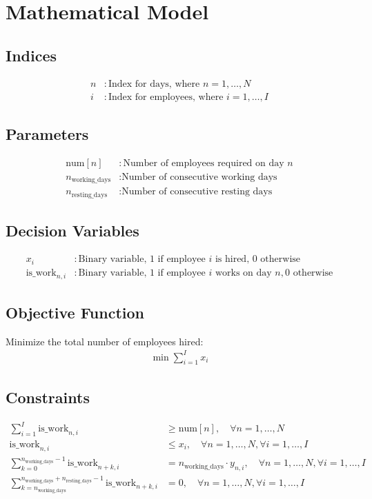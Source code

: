 \documentclass{article}
\begin{document}
\section*{Mathematical Model}

\subsection*{Indices}
\begin{align*}
n & : \text{Index for days, where } n = 1, \ldots, N \\
i & : \text{Index for employees, where } i = 1, \ldots, I 
\end{align*}

\subsection*{Parameters}
\begin{align*}
\text{num}[n] & : \text{Number of employees required on day } n \\
n_{\text{working\_days}} & : \text{Number of consecutive working days} \\
n_{\text{resting\_days}} & : \text{Number of consecutive resting days}
\end{align*}

\subsection*{Decision Variables}
\begin{align*}
x_i & : \text{Binary variable, 1 if employee } i \text{ is hired, 0 otherwise} \\
\text{is\_work}_{n,i} & : \text{Binary variable, 1 if employee } i \text{ works on day } n, 0 \text{ otherwise}
\end{align*}

\subsection*{Objective Function}
Minimize the total number of employees hired:
\begin{align*}
\min \sum_{i=1}^{I} x_i
\end{align*}

\subsection*{Constraints}
\begin{align}
\sum_{i=1}^{I} \text{is\_work}_{n,i} & \geq \text{num}[n], \quad \forall n = 1, \ldots, N \\
\text{is\_work}_{n,i} & \leq x_i, \quad \forall n = 1, \ldots, N, \forall i = 1, \ldots, I \\
\sum_{k=0}^{n_{\text{working\_days}}-1} \text{is\_work}_{n+k,i} & = n_{\text{working\_days}} \cdot y_{n,i}, \quad \forall n = 1, \ldots, N, \forall i = 1, \ldots, I \\
\sum_{k=n_{\text{working\_days}}}^{n_{\text{working\_days}}+n_{\text{resting\_days}}-1} \text{is\_work}_{n+k,i} & = 0, \quad \forall n = 1, \ldots, N, \forall i = 1, \ldots, I
\end{align}
\end{document}
